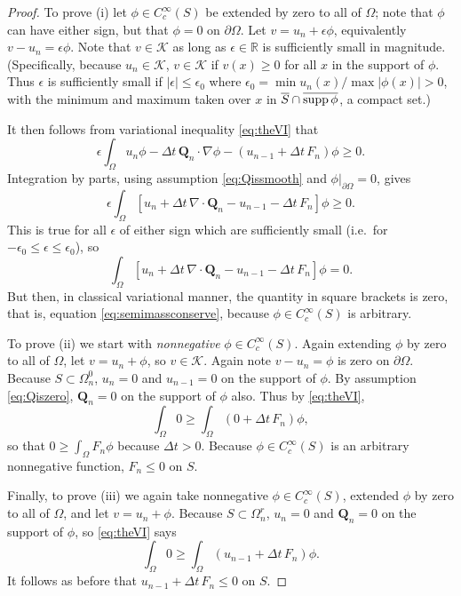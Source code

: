 \documentclass[final,leqno,onefignum,onetabnum]{siamltex1213bueler}
\newcommand\bQ{\mathbf{Q}}
\newcommand{\Div}{\nabla\cdot}
\newcommand\eps{\epsilon}
\renewcommand{\grad}{\nabla}
\newcommand\RR{\mathbb{R}}
\begin{document}
\begin{proof}  To prove (i) let $\phi\in C_c^\infty(S)$ be extended by zero to all of $\Omega$; note that $\phi$ can have either sign, but that $\phi=0$ on $\partial\Omega$.  Let $v = u_n + \eps \phi$, equivalently $v-u_n = \eps \phi$.  Note that $v \in \mathcal{K}$ as long as $\eps\in\RR$ is sufficiently small in magnitude.  (Specifically, because $u_n\in\mathcal{K}$, $v\in\mathcal{K}$ if $v(x)\ge 0$ for all $x$ in the support of $\phi$.  Thus $\eps$ is sufficiently small if $|\eps|\le \eps_0$ where $\eps_0 = \min u_n(x) / \max |\phi(x)| > 0$, with the minimum and maximum taken over $x$ in $\overline{S}\cap \overline{\supp \phi}$, a compact set.)

It then follows from variational inequality \eqref{eq:theVI} that
   $$\eps \int_\Omega u_n \phi - \Delta t\,\bQ_n \cdot \grad \phi - (u_{n-1} + \Delta t\,F_n)\phi \ge 0.$$
Integration by parts, using assumption \eqref{eq:Qissmooth} and $\phi\big|_{\partial\Omega}=0$, gives
   $$\eps \int_\Omega \left[u_n + \Delta t\,\Div\bQ_n - u_{n-1} - \Delta t\,F_n \right]\phi \ge 0.$$
This is true for all $\eps$ of either sign which are sufficiently small (i.e.~for $-\eps_0 \le \eps \le \eps_0$), so
   $$\int_\Omega \left[u_n + \Delta t\,\Div\bQ_n - u_{n-1} - \Delta t\,F_n\right]\phi = 0.$$
But then, in classical variational manner, the quantity in square brackets is zero, that is, equation \eqref{eq:semimassconserve}, because $\phi\in C_c^\infty(S)$ is arbitrary.

To prove (ii) we start with \emph{nonnegative} $\phi\in C_c^\infty(S)$.  Again extending $\phi$ by zero to all of $\Omega$, let $v = u_n + \phi$, so $v\in\mathcal{K}$.  Again note $v-u_n=\phi$ is zero on $\partial \Omega$.  Because $S\subset \Omega_n^0$, $u_n=0$ and $u_{n-1}=0$ on the support of $\phi$.  By assumption \eqref{eq:Qiszero}, $\bQ_n=0$ on the support of $\phi$ also.  Thus by \eqref{eq:theVI},
    $$\int_{\Omega} 0 \ge \int_{\Omega} \left(0 + \Delta t\, F_n\right) \phi,$$
so that $0 \ge \int_{\Omega} F_n \phi$ because $\Delta t>0$.  Because $\phi\in C_c^\infty(S)$ is an arbitrary nonnegative function, $F_n \le 0$ on $S$.

Finally, to prove (iii) we again take nonnegative $\phi\in C_c^\infty(S)$, extended $\phi$ by zero to all of $\Omega$, and let $v=u_n+\phi$.  Because $S\subset \Omega_n^r$, $u_n=0$ and $\bQ_n=0$ on the support of $\phi$, so \eqref{eq:theVI} says
    $$\int_{\Omega} 0 \ge \int_{\Omega} \left(u_{n-1} + \Delta t\, F_n\right) \phi.$$
It follows as before that $u_{n-1} + \Delta t\, F_n \le 0$ on $S$.
\end{proof}
\end{document}
